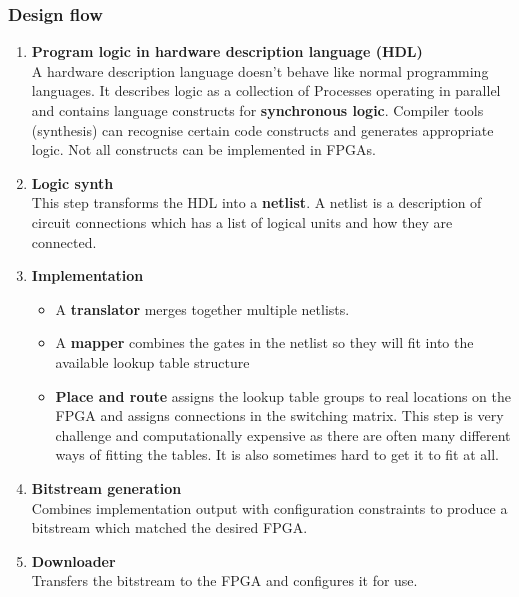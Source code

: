 \documentclass[11pt]{article}
\begin{document}
\subsubsection{Design flow}
\begin{enumerate}
\item \textbf{Program logic in hardware description language (HDL)} \\
A hardware description language doesn't behave like normal programming languages. It describes logic as a collection of Processes operating in parallel and contains language constructs for \textbf{synchronous logic}. Compiler tools (synthesis) can recognise certain code constructs and generates appropriate logic. Not all constructs can be implemented in FPGAs.
\item \textbf{Logic synth} \\
This step transforms the HDL into a \textbf{netlist}. A netlist is a description of circuit connections which has a list of logical units and how they are connected. 
\item \textbf{Implementation}
\begin{itemize}
\item A \textbf{translator} merges together multiple netlists.
\item A \textbf{mapper} combines the gates in the netlist so they will fit into the available lookup table structure
\item \textbf{Place and route} assigns the lookup table groups to real locations on the FPGA and assigns connections in the switching matrix. This step is very challenge and computationally expensive as there are often many different ways of fitting the tables. It is also sometimes hard to get it to fit at all.
\end{itemize}
\item \textbf{Bitstream generation} \\
Combines implementation output with configuration constraints to produce a bitstream which matched the desired FPGA.
\item \textbf{Downloader} \\
Transfers the bitstream to the FPGA and configures it for use.
\end{enumerate}
\end{document}

